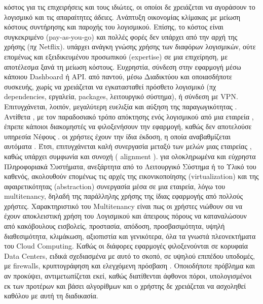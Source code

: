 \documentclass{article}
\begin{document}
\begin{itemize}
     κόστος για τις επιχειρήσεις και τους ιδιώτες, οι οποίοι δε χρειάζεται να αγοράσουν το λογισμικό και τις απαραίτητες άδειες. Ανάπτυξη οικονομίας κλίμακας με μείωση κόστους συντήρησης και παροχής του λογισμικού. Επίσης, το κόστος είναι συγκεκριμένο (pay-as-you-go) και πολλές φορές δεν υπάρχει από την αρχή της χρήσης (πχ Netflix). 
     υπάρχει ανάγκη γνώσης χρήσης των διαφόρων λογισμικών, ούτε επομένως και εξειδικευμένου προσωπικού  (expertise)  σε μια επιχείρηση, με αποτέλεσμα ξανά τη μείωση κόστους. Ευχρηστία, σύνδεση στην εφαρμογή μέσω κάποιου Dashboard ή API.
     από παντού, μέσω Διαδικτύου και οποιασδήποτε συσκευής, χωρίς να χρειάζεται να εγκατασταθεί πρόσθετο λογισμικό (πχ dependencies, εργαλεία, packages, λειτουργικό σύστημα), ή σύνδεση με VPN. Επιτυγχάνεται, λοιπόν, μεγαλύτερη ευελιξία και αύξηση της παραγωγικότητας  . Αντίθετα , με τον παραδοσιακό τρόπο απόκτησης ενός λογισμικού από μια εταιρεία , έπρεπε κάποιοι διακομηστές να φιλοξενήσουν την εφαρμογή, καθώς δεν αποτελούσε υπηρεσία Νέφους .
     οι χρήστες έχουν την ίδια έκδοση, η οποία αναβαθμίζεται αυτόματα . Έτσι, επιτυγχάνεται καλή συνεργασία μεταξύ των μελών μιας εταιρείας , καθώς υπάρχει συμφωνία και συνοχή ( alignment ).
     για ολοκληρωμένα και εύχρηστα Πληροφοριακά Συστήματα, ανεξάρτητα από το Λειτουργικό Σύστημα ή το Υλικό του καθενός, ακολουθούν επομένως τις αρχές της εικονικοποίησης (virtualization) και της αφαιρετικότητας (abstraction)
     συνεργασία μέσα σε μια εταιρεία, λόγω του multitenancy, δηλαδή της παράλληλης χρήσης της ίδιας εφαρμογής από πολλούς χρήστες. Χαρακτηριστικό του Multitenancy είναι πως οι χρήστες νιώθουν σα να έχουν αποκλειστική χρήση του Λογισμικού και άπειρους πόρους να καταναλώσουν
     από κακόβουλους εισβολείς, προστασία, απόδοση, προσβασιμότητα, υψηλή διαθεσιμότητα, κλιμάκωση, αξιοπιστία και γενικότερα, όλα τα γνωστά πλεονεκτήματα του Cloud Computing. Καθώς οι διάφορες εφαρμογές φιλοξενούνται σε κορυφαία Data Centers, ειδικά σχεδιασμένα με αυτό το σκοπό, σε υψηλού επιπέδου υποδομές, με firewalls, κρυπτογράφηση και ελεγχόμενη πρόσβαση . Οποιοδήποτε πρόβλημα και αν προκύψει, αντιμετωπίζεται εκεί, καθώς διατίθενται άφθονοι πόροι, υπολογισμένοι εκ των προτέρων και βάσει αλγορίθμων και ο χρήστης δε χρειάζεται να ασχοληθεί καθόλου με αυτή τη διαδικασία.

\end{itemize}
\end{document}
